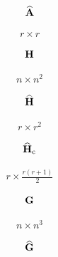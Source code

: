 \documentclass[12 pt]{article}
\begin{document}
\begin{align*}
    \widehat{\mathbf{A}}
\end{align*}

\begin{align*}
    r \times r
\end{align*}

\begin{align*}
    \mathbf{H}
\end{align*}

\begin{align*}
    n \times n^2
\end{align*}

\begin{align*}
    \widehat{\mathbf{H}}
\end{align*}

\begin{align*}
    r \times r^2
\end{align*}

\begin{align*}
    \widehat{\mathbf{H}}_\textrm{c}
\end{align*}

\begin{align*}
    r \times \frac{r(r+1)}{2}
\end{align*}

\begin{align*}
    \mathbf{G}
\end{align*}

\begin{align*}
    n \times n^3
\end{align*}

\begin{align*}
    \widehat{\mathbf{G}}
\end{align*}
\end{document}

